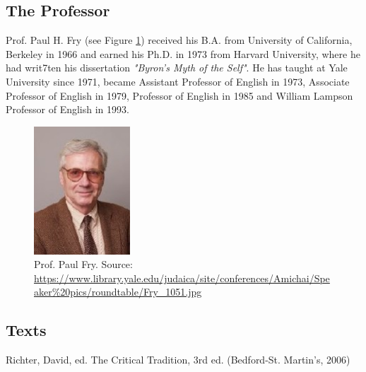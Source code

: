 \documentclass[]{scrartcl}
\begin{document}
\subsection{The Professor}
Prof. Paul H. Fry (see Figure \ref{fig:paul_fry}) received his B.A. from University of California, Berkeley in 1966 and earned his Ph.D. in 1973 from Harvard University, where he had writ7ten his dissertation \emph{"Byron’s Myth of the Self"}. He has taught at Yale University since 1971, became Assistant Professor of English in 1973, Associate Professor of English in 1979, Professor of English in 1985 and William Lampson Professor of English in 1993.

\begin{figure}[]
	\centering
	\includegraphics[width=0.32\textwidth]{images/paul_fry.jpg}
	\caption{Prof. Paul Fry. Source: \url{https://www.library.yale.edu/judaica/site/conferences/Amichai/Speaker\%20pics/roundtable/Fry_1051.jpg}}
	\label{fig:paul_fry}
\end{figure}

\subsection{Texts}

Richter, David, ed. The Critical Tradition, 3rd ed. (Bedford-St. Martin's, 2006)
\end{document}
